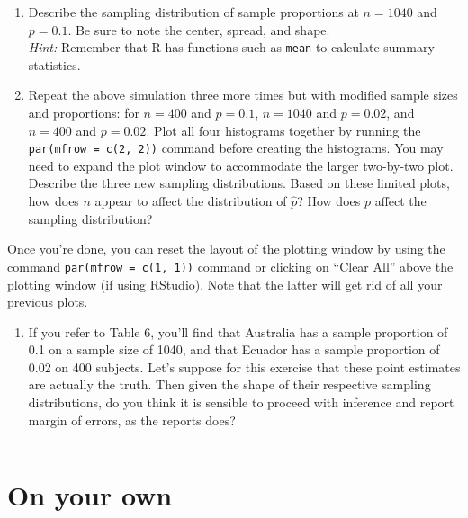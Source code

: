 \documentclass[]{book}
\providecommand{\tightlist}{%
  \setlength{\itemsep}{0pt}\setlength{\parskip}{0pt}}
\theoremstyle{definition}
\theoremstyle{definition}
\theoremstyle{remark}
\begin{document}
\begin{enumerate}
\def\labelenumi{\arabic{enumi}.}
\setcounter{enumi}{8}
\item
  Describe the sampling distribution of sample proportions at
  \(n = 1040\) and \(p = 0.1\). Be sure to note the center, spread, and
  shape.\\
  \emph{Hint:} Remember that R has functions such as \texttt{mean} to
  calculate summary statistics.
\item
  Repeat the above simulation three more times but with modified sample
  sizes and proportions: for \(n = 400\) and \(p = 0.1\), \(n = 1040\)
  and \(p = 0.02\), and \(n = 400\) and \(p = 0.02\). Plot all four
  histograms together by running the \texttt{par(mfrow\ =\ c(2,\ 2))}
  command before creating the histograms. You may need to expand the
  plot window to accommodate the larger two-by-two plot. Describe the
  three new sampling distributions. Based on these limited plots, how
  does \(n\) appear to affect the distribution of \(\hat{p}\)? How does
  \(p\) affect the sampling distribution?
\end{enumerate}

Once you're done, you can reset the layout of the plotting window by
using the command \texttt{par(mfrow\ =\ c(1,\ 1))} command or clicking
on ``Clear All'' above the plotting window (if using RStudio). Note that
the latter will get rid of all your previous plots.

\begin{enumerate}
\def\labelenumi{\arabic{enumi}.}
\setcounter{enumi}{10}
\tightlist
\item
  If you refer to Table 6, you'll find that Australia has a sample
  proportion of 0.1 on a sample size of 1040, and that Ecuador has a
  sample proportion of 0.02 on 400 subjects. Let's suppose for this
  exercise that these point estimates are actually the truth. Then given
  the shape of their respective sampling distributions, do you think it
  is sensible to proceed with inference and report margin of errors, as
  the reports does?
\end{enumerate}

\begin{center}\rule{0.5\linewidth}{\linethickness}\end{center}

\section*{On your own}\label{on-your-own-5}
\end{document}

